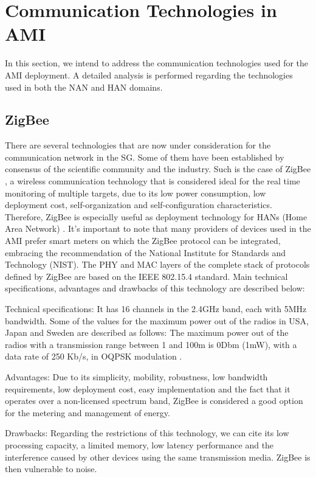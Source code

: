 \documentclass[11pt,draftclsnofoot,onecolumn]{IEEEtran}
\begin{document}
\section{Communication Technologies in AMI}\label{technologies}

In this section, we intend to address the communication technologies used for the AMI deployment. A detailed analysis is performed regarding the technologies used in both the NAN and HAN domains.

\subsection{ZigBee}

There are several technologies that are now under consideration for the communication network in the SG. Some of them have been established by consensus of the scientific community and the industry. Such is the case of ZigBee \cite{Alliance2010}, a wireless communication technology that is considered ideal for the real time monitoring of multiple targets, due to its low power consumption, low deployment cost, self-organization and self-configuration characteristics. Therefore, ZigBee is especially useful as deployment technology for HANs (Home Area Network) \cite{Sabbah2014}. It’s important to note that many providers of devices used in the AMI prefer smart meters on which the ZigBee protocol can be integrated, embracing the recommendation of the National Institute for Standards and Technology (NIST). The PHY and MAC layers of the complete stack of protocols defined by ZigBee are based on the IEEE 802.15.4 standard. Main technical specifications, advantages and drawbacks of this technology are described below:

Technical specifications: It has 16 channels in the 2.4GHz band, each with 5MHz bandwidth. Some of the values for the maximum power out of the radios in USA, Japan and Sweden are described as follows: The maximum power out of the radios with a transmission range between 1 and 100m is 0Dbm (1mW), with a data rate of 250 Kb/s, in OQPSK modulation \cite{Sabbah2014}.

Advantages: Due to its simplicity, mobility, robustness, low bandwidth requirements, low deployment cost, easy implementation and the fact that it operates over a non-licensed spectrum band, ZigBee is considered a good option for the metering and management of energy.

Drawbacks: Regarding the restrictions of this technology, we can cite its low processing capacity, a limited memory, low latency performance and the interference caused by other devices using the same transmission media. ZigBee is then vulnerable to noise.
\end{document}
